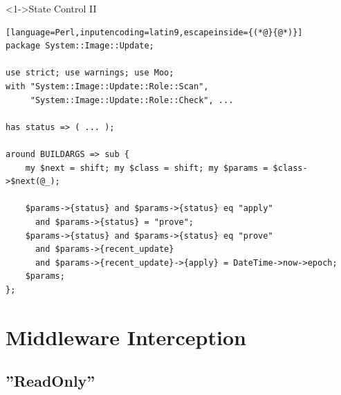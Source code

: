 \documentclass[ngerman,xcolor={table,dvipsnames},smaller,compress,hyperref={bookmarks,colorlinks},handout]{beamer}%
\begin{document}
\begin{frame}[t,fragile]

\begin{block}<1->{State Control II}
\scriptsize
\begin{lstlisting}[language=Perl,inputencoding=latin9,escapeinside={(*@}{@*)}]
package System::Image::Update;

use strict; use warnings; use Moo;
with "System::Image::Update::Role::Scan",
     "System::Image::Update::Role::Check", ...

has status => ( ... );

around BUILDARGS => sub {
    my $next = shift; my $class = shift; my $params = $class->$next(@_);

    $params->{status} and $params->{status} eq "apply"
      and $params->{status} = "prove";
    $params->{status} and $params->{status} eq "prove"
      and $params->{recent_update}
      and $params->{recent_update}->{apply} = DateTime->now->epoch;
    $params;
};
\end{lstlisting}
\end{block}

\begin{itemize}
\end{itemize}

\end{frame}

\section{Middleware Interception}

\subsection{''ReadOnly''}
\end{document}
